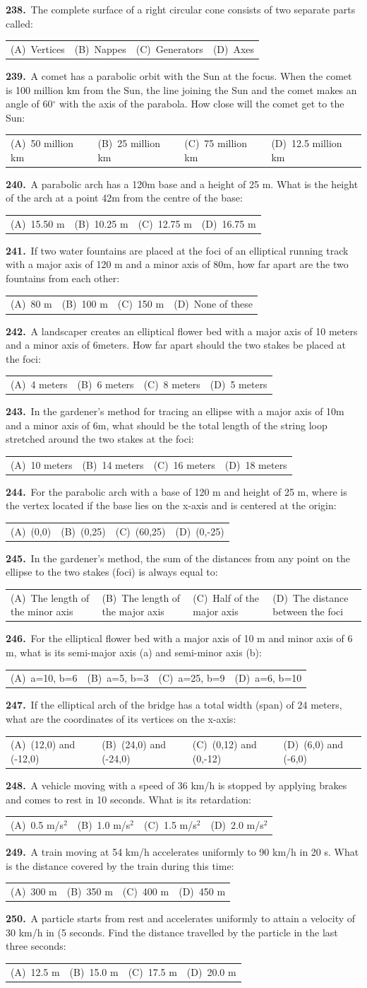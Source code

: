 \documentclass[11pt,a4paper]{article}
\makeatletter
\newcommand{\mcq}[6]{%
  \Needspace{4\baselineskip}%
  \par\medskip\noindent\textbf{#1.}\ #2\par\nopagebreak
  \noindent\begin{tabularx}{\linewidth}{@{\hspace{1.5em}}*{4}{>{\raggedright\arraybackslash}X}@{}}
    (A)~#3 & (B)~#4 & (C)~#5 & (D)~#6
  \end{tabularx}\par}
\makeatother
\begin{document}
\mcq{238}{The complete surface of a right circular cone consists of two separate parts called:}{Vertices}{Nappes}{Generators}{Axes}
\mcq{239}{A comet has a parabolic orbit with the Sun at the focus. When the comet is 100 million km from the Sun, the line joining the Sun and the comet makes an angle of 60$^{\circ}$ with the axis of the parabola. How close will the comet get to the Sun:}{50 million km}{25 million km}{75 million km}{12.5 million km}
\mcq{240}{A parabolic arch has a 120m base and a height of 25 m. What is the height of the arch at a point 42m from the centre of the base:}{15.50 m}{10.25 m}{12.75 m}{16.75 m}
\mcq{241}{If two water fountains are placed at the foci of an elliptical running track with a major axis of 120 m and a minor axis of 80m, how far apart are the two fountains from each other:}{80 m}{100 m}{150 m}{None of these}
\mcq{242}{A landscaper creates an elliptical flower bed with a major axis of 10 meters and a minor axis of 6meters. How far apart should the two stakes be placed at the foci:}{4 meters}{6 meters}{8 meters}{5 meters}
\mcq{243}{In the gardener's method for tracing an ellipse with a major axis of 10m and a minor axis of 6m, what should be the total length of the string loop stretched around the two stakes at the foci:}{10 meters}{14 meters}{16 meters}{18 meters}
\mcq{244}{For the parabolic arch with a base of 120 m and height of 25 m, where is the vertex located if the base lies on the x-axis and is centered at the origin:}{(0,0)}{(0,25)}{(60,25)}{(0,-25)}
\mcq{245}{In the gardener's method, the sum of the distances from any point on the ellipse to the two stakes (foci) is always equal to:}{The length of the minor axis}{The length of the major axis}{Half of the major axis}{The distance between the foci}
\mcq{246}{For the elliptical flower bed with a major axis of 10 m and minor axis of 6 m, what is its semi-major axis (a) and semi-minor axis (b):}{a=10, b=6}{a=5, b=3}{a=25, b=9}{a=6, b=10}
\mcq{247}{If the elliptical arch of the bridge has a total width (span) of 24 meters, what are the coordinates of its vertices on the x-axis:}{(12,0) and (-12,0)}{(24,0) and (-24,0)}{(0,12) and (0,-12)}{(6,0) and (-6,0)}
\mcq{248}{A vehicle moving with a speed of 36 km/h is stopped by applying brakes and comes to rest in 10 seconds. What is its retardation:}{0.5 m/s$^{2}$}{1.0 m/s$^{2}$}{1.5 m/s$^{2}$}{2.0 m/s$^{2}$}
\mcq{249}{A train moving at 54 km/h accelerates uniformly to 90 km/h in 20 s. What is the distance covered by the train during this time:}{300 m}{350 m}{400 m}{450 m}
\mcq{250}{A particle starts from rest and accelerates uniformly to attain a velocity of 30 km/h in (5 seconds. Find the distance travelled by the particle in the last three seconds:}{12.5 m}{15.0 m}{17.5 m}{20.0 m}
\end{document}
